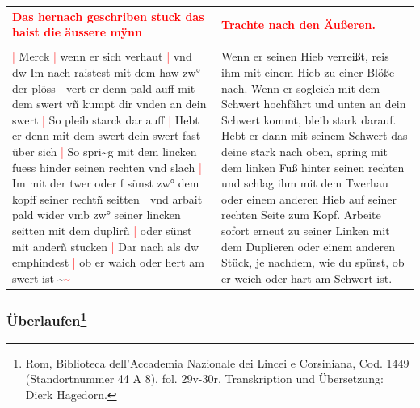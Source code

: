 \begin{longtable}{p{6.25cm}p{6.25cm}}
    \textbf{\textcolor{red}{
        Das hernach geschriben stuck das haist die äussere mÿnn}}
    &
    \textbf{\textcolor{red}{
        Trachte nach den Äußeren.}}
    \\
    \\
    \textcolor{red}{|} Merck
    \textcolor{red}{|} wenn er sich verhaut
    \textcolor{red}{|} vnd dw Im nach raistest mit dem haw zw° der plöss
    \textcolor{red}{|} vert er denn pald auff mit dem swert vñ kumpt dir vnden an dein swert
    \textcolor{red}{|} So pleib starck dar auff
    \textcolor{red}{|} Hebt er denn mit dem swert dein swert fast über sich
    \textcolor{red}{|} So spri\textasciitilde{}g mit dem lincken fuess hinder seinen rechten vnd slach
    \textcolor{red}{|} Im mit der twer oder f sünst zw° dem kopff seiner rechtñ seitten
    \textcolor{red}{|} vnd arbait pald wider vmb zw° seiner lincken seitten mit dem duplirñ
    \textcolor{red}{|} oder sünst mit anderñ stucken
    \textcolor{red}{|} Dar nach als dw emphindest
    \textcolor{red}{|} ob er waich oder hert am swert ist \textasciitilde{}\textcolor{red}{\textasciitilde{}}
    &
    Wenn er seinen Hieb verreißt, reis ihm mit einem Hieb zu einer Blöße nach.
    Wenn er sogleich mit dem Schwert hochfährt und unten an dein Schwert kommt, bleib stark darauf.
    Hebt er dann mit seinem Schwert das deine stark nach oben, spring mit dem linken Fuß hinter seinen rechten und schlag ihm mit dem Twerhau oder einem anderen Hieb auf seiner rechten Seite zum Kopf.
    Arbeite sofort erneut zu seiner Linken mit dem Duplieren oder einem anderen Stück, je nachdem, wie du spürst, ob er weich oder hart am Schwert ist.
\end{longtable}

\newpage

\begin{center}
\end{center}

\newpage

\subsubsection[Überlaufen]{
    Überlaufen\footnote{
        \hspace*{0.5ex}Rom, Biblioteca dell'Accademia Nazionale dei Lincei e Corsiniana,
        Cod. 1449 (Standortnummer 44 A 8), fol. 29v-30r, Transkription und Übersetzung: Dierk Hagedorn.}}

